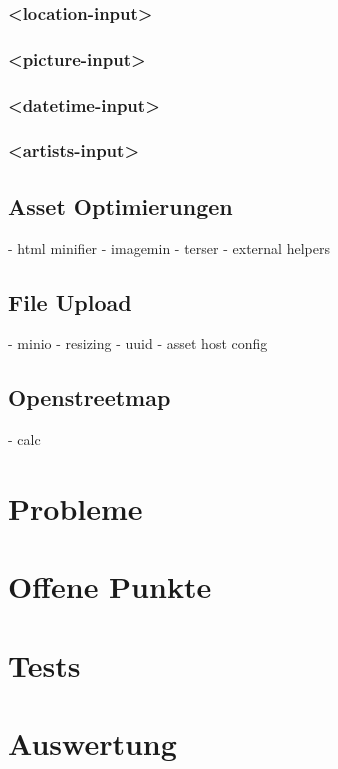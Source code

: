 \subsubsection{<location-input>}

\subsubsection{<picture-input>}

\subsubsection{<datetime-input>}

\subsubsection{<artists-input>}

\clearpage
\subsection{Asset Optimierungen}

- html minifier
- imagemin
- terser
- external helpers

\clearpage
\subsection{File Upload}

- minio
- resizing
- uuid
- asset host config

\subsection{Openstreetmap}

- calc

\clearpage
\section{Probleme}

\clearpage
\section{Offene Punkte}

\clearpage
\section{Tests}

\section{Auswertung}
